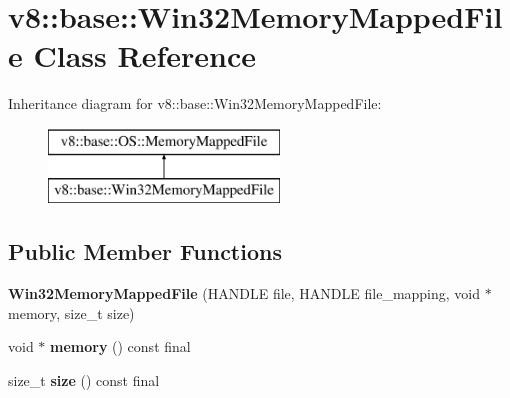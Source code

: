 \hypertarget{classv8_1_1base_1_1_win32_memory_mapped_file}{}\section{v8\+:\+:base\+:\+:Win32\+Memory\+Mapped\+File Class Reference}
\label{classv8_1_1base_1_1_win32_memory_mapped_file}
Inheritance diagram for v8\+:\+:base\+:\+:Win32\+Memory\+Mapped\+File\+:\begin{figure}[H]
\begin{center}
\leavevmode
\includegraphics[height=2.000000cm]{classv8_1_1base_1_1_win32_memory_mapped_file}
\end{center}
\end{figure}
\subsection*{Public Member Functions}
\begin{DoxyCompactItemize}
\item 
{\bfseries Win32\+Memory\+Mapped\+File} (H\+A\+N\+D\+LE file, H\+A\+N\+D\+LE file\+\_\+mapping, void $\ast$memory, size\+\_\+t size)\hypertarget{classv8_1_1base_1_1_win32_memory_mapped_file_ae1e188f285fecab7d70a09ef5a796a5a}{}\label{classv8_1_1base_1_1_win32_memory_mapped_file_ae1e188f285fecab7d70a09ef5a796a5a}

\item 
void $\ast$ {\bfseries memory} () const  final\hypertarget{classv8_1_1base_1_1_win32_memory_mapped_file_a228a37d0af23d859318a6caf5278b342}{}\label{classv8_1_1base_1_1_win32_memory_mapped_file_a228a37d0af23d859318a6caf5278b342}

\item 
size\+\_\+t {\bfseries size} () const  final\hypertarget{classv8_1_1base_1_1_win32_memory_mapped_file_aa30f1867cf32508ee08cafddba2c4aad}{}\label{classv8_1_1base_1_1_win32_memory_mapped_file_aa30f1867cf32508ee08cafddba2c4aad}

\end{DoxyCompactItemize}
